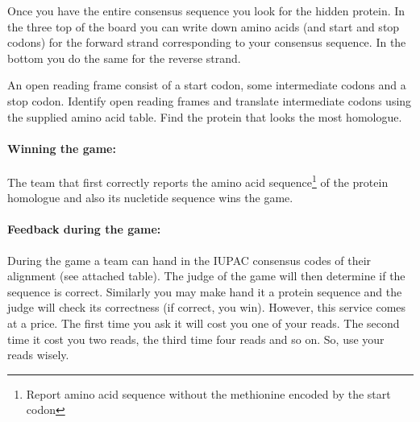 Once you have the entire  consensus sequence you look for the hidden protein. 
In the three top of the board you can write down amino acids  (and start and stop codons) for the forward strand corresponding to your consensus sequence. 
In the bottom you do the same for the reverse strand.

An open reading frame consist of a start codon, some intermediate codons and a stop codon. Identify open reading frames and translate intermediate codons using the supplied 
amino acid table. Find the protein that looks the most homologue. 

\paragraph{Winning the game:}
The team that first correctly reports the amino acid sequence\footnote{Report amino acid sequence without the methionine encoded by the start codon} of the protein homologue and also its nucletide sequence wins the game.

\paragraph{Feedback during the game:} 
During the game a team can hand in the IUPAC consensus codes of their alignment (see attached table).
The judge of the game will then determine if the sequence is correct. Similarly you may make hand it 
a protein sequence and the judge will check its correctness (if correct, you win).  However, this service comes at a price.
The first time you ask it will cost you one of your reads. The second time it cost you two reads, the third time four reads and so on. 
So, use your reads wisely.

